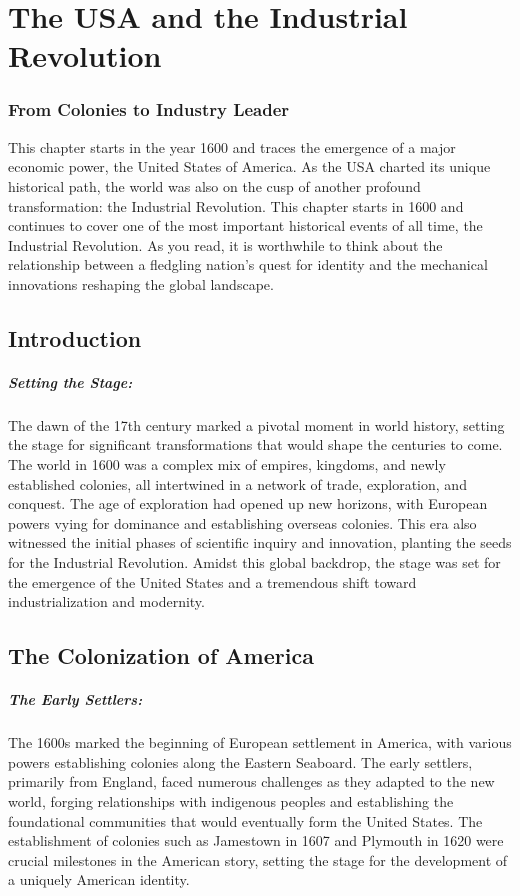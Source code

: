 \documentclass[a4paper,12pt]{book}
\begin{document}
\chapter{The USA and the Industrial Revolution}
\subsection*{From Colonies to Industry Leader}
This chapter starts in the year 1600 and traces the emergence of a major economic power, the United States of America. As the USA charted its unique historical path, the world was also on the cusp of another profound transformation: the Industrial Revolution. This chapter starts in 1600 and continues to cover one of the most important historical events of all time, the Industrial Revolution. As you read, it is worthwhile to think about the relationship between a fledgling nation's quest for identity and the mechanical innovations reshaping the global landscape.

\section*{Introduction}

\paragraph{Setting the Stage:}
The dawn of the 17th century marked a pivotal moment in world history, setting the stage for significant transformations that would shape the centuries to come. The world in 1600 was a complex mix of empires, kingdoms, and newly established colonies, all intertwined in a network of trade, exploration, and conquest. The age of exploration had opened up new horizons, with European powers vying for dominance and establishing overseas colonies. This era also witnessed the initial phases of scientific inquiry and innovation, planting the seeds for the Industrial Revolution. Amidst this global backdrop, the stage was set for the emergence of the United States and a tremendous shift toward industrialization and modernity.

\section*{The Colonization of America}

\paragraph{The Early Settlers:}
The 1600s marked the beginning of European settlement in America, with various powers establishing colonies along the Eastern Seaboard. The early settlers, primarily from England, faced numerous challenges as they adapted to the new world, forging relationships with indigenous peoples and establishing the foundational communities that would eventually form the United States. The establishment of colonies such as Jamestown in 1607 and Plymouth in 1620 were crucial milestones in the American story, setting the stage for the development of a uniquely American identity.
\end{document}
